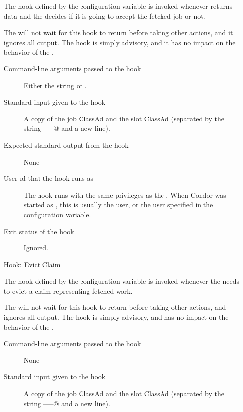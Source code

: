 \begin{itemize}
The hook defined by the configuration variable
 is invoked whenever
 returns data and the 
decides if it is going to accept the fetched job or not.

The  will not wait for this hook to return before
taking other actions, and it ignores all output.
The hook is simply advisory, and it has no impact on the behavior of the
.

\begin{description}
\item[Command-line arguments passed to the hook]
  Either the string \verb@accept@ or \verb@reject@.

\item[Standard input given to the hook]
  A copy of the job ClassAd and the slot ClassAd
  (separated by the string \verb@-----@ and a new line).

\item[Expected standard output from the hook]
  None.

\item[User id that the hook runs as]
  The  hook runs with the same
privileges as the .  When Condor was started as ,
this is usually the  user, or the user specified in
the  configuration variable.

\item[Exit status of the hook]
  Ignored.
\end{description}


\item[Hook: Evict Claim]

The hook defined by the configuration variable
 is invoked whenever the 
needs to evict a claim representing fetched work.

The  will not wait for this hook to return before
taking other actions, and ignores all output.
The hook is simply advisory, and has no impact on the behavior of the
.

\begin{description}
\item[Command-line arguments passed to the hook]
  None.

\item[Standard input given to the hook]
  A copy of the job ClassAd and the slot ClassAd
  (separated by the string \verb@-----@ and a new line).


\end{description}
\end{itemize}

